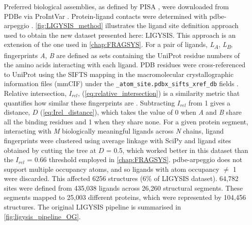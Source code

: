 Preferred biological assemblies, as defined by PISA \cite{KRISSINEL_2007_PISA}, were downloaded from PDBe via ProIntVar \cite{MACGOWAN_2020_DRSASP}. Protein-ligand contacts were determined with pdbe-arpeggio \cite{JUBB_2017_ARPEGGIO}. \autoref{fig:LIGYSIS_method} illustrates the ligand site definition approach used to obtain the new dataset presented here: LIGYSIS. This approach is an extension of the one used in \autoref{chap:FRAGSYS}. For a pair of ligands, \textit{L\textsubscript{A}}, \textit{L\textsubscript{B}}, fingerprints \textit{A}, \textit{B} are defined as sets containing the UniProt residue numbers of the amino acids interacting with each ligand. PDB residues were cross-referenced to UniProt using the SIFTS mapping in the macromolecular crystallographic information files (mmCIF) under the \texttt{\_atom\_site.pdbx\_si\discretionary{-}{}{}fts\_xref\_db} fields \cite{VELANKAR_2012_SIFTS, DANA_2018_SIFTS}. Relative intersection, $I_{rel}$, (\autoref{eq:relative_intersection}) is a similarity metric that quantifies how similar these fingerprints are \cite{UTGES_2024_FRAGSYS}. Subtracting $I_{rel}$ from 1 gives a distance, $D$ (\autoref{eq:Irel_distance}), which takes the value of 0 when \textit{A} and \textit{B} share all the binding residues and 1 when they share none. For a given protein segment, interacting with \textit{M} biologically meaningful ligands across \textit{N} chains, ligand fingerprints were clustered using average linkage with SciPy \cite{VIRTANEN_2020_SCIPY} and ligand sites obtained by cutting the tree at $D$ = 0.5, which worked better in this dataset than the $I_{rel}$ = 0.66 threshold employed in \autoref{chap:FRAGSYS}. pdbe-arpeggio does not support multiple occupancy atoms, and so ligands with atom occupancy $\neq$ 1 were discarded. This affected 6256 structures (6\% of LIGYSIS dataset). 64,782 sites were defined from 435,038 ligands across 26,260 structural segments. These segments mapped to 25,003 different proteins, which were represented by 104,456 structures. The original LIGYSIS pipeline is summarised in \autoref{fig:ligysis_pipeline_OG}.

